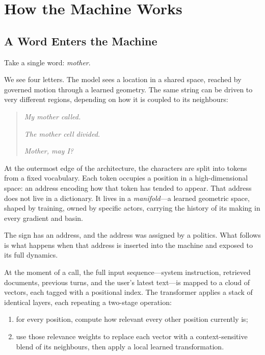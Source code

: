 
\chapter{How the Machine Works}
\thispagestyle{plain}

\bigskip

\section{A Word Enters the Machine}

Take a single word: \emph{mother}.

We see four letters. The model sees a location in a shared space, reached by governed motion through a learned geometry. The same string can be driven to very different regions, depending on how it is coupled to its neighbours:

\begin{quote}
\emph{My mother called.}

\emph{The mother cell divided.}

\emph{Mother, may I?}
\end{quote}

At the outermost edge of the architecture, the characters are split into tokens from a fixed vocabulary. Each token occupies a position in a high-dimensional space: an address encoding how that token has tended to appear. That address does not live in a dictionary. It lives in a \emph{manifold}---a learned geometric space, shaped by training, owned by specific actors, carrying the history of its making in every gradient and basin.

The sign has an address, and the address was assigned by a politics. What follows is what happens when that address is inserted into the machine and exposed to its full dynamics.

At the moment of a call, the full input sequence---system instruction, retrieved documents, previous turns, and the user's latest text---is mapped to a cloud of vectors, each tagged with a positional index. The transformer applies a stack of identical layers, each repeating a two-stage operation:

\begin{enumerate}
  \item for every position, compute how relevant every other position currently is;
  \item use those relevance weights to replace each vector with a context-sensitive blend of its neighbours, then apply a local learned transformation.
\end{enumerate}


